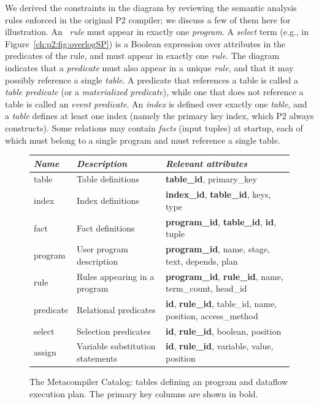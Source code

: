 We derived the constraints in the diagram by reviewing the semantic analysis
rules enforced in the original P2 compiler; we discuss a few of them here for
illustration.  An \OVERLOG~{\em rule} must appear in exactly one {\em program}.
A {\em select} term (e.g.,  in
Figure~\ref{ch:p2:fig:overlogSP}) is a Boolean expression over attributes in
the predicates of the rule, and must appear in exactly one {\em rule}.  The
diagram indicates that a {\em predicate} must also appear in a unique {\em
rule}, and that it may possibly reference a single {\em table}.  A predicate
that references a table is called a {\em table predicate} (or a
\emph{materialized predicate}), while one that does not reference a table is
called an {\em event predicate}.  An {\em index} is defined over exactly one
{\em table}, and a {\em table} defines at least one index (namely the primary
key index, which P2 always constructs).  Some relations may contain {\em facts}
(input tuples) at startup, each of which must belong to a single program and
must reference a single table.

\begin{figure}
\centering
\ssp
\begin{tabular}{|l|l|p{6.3cm}|} \hline
{\it Name}& {\it Description} & {\it Relevant attributes} \\ \hline\hline
table     & Table definitions & {\bf table\_id}, primary\_key\\ \hline
index     & Index definitions & {\bf index\_id}, {\bf table\_id}, keys, type \\ \hline
fact      & Fact definitions  & {\bf program\_id}, {\bf table\_id}, {\bf id}, tuple\\ \hline
program   & User program description     & {\bf program\_id}, name, stage, text, depends, plan \\ \hline
rule      & Rules appearing in a program   & {\bf program\_id}, {\bf rule\_id}, name,  term\_count, head\_id \\ \hline
predicate & Relational predicates  & {\bf id}, {\bf rule\_id}, table\_id, name, position, access\_method \\ \hline
select    & Selection predicates  & {\bf id}, {\bf rule\_id}, boolean, position \\  \hline
assign    & Variable substitution statements & {\bf id}, {\bf rule\_id}, variable, value, position \\ \hline 
\end{tabular}
\caption{The Metacompiler Catalog: tables defining an \OVERLOG program and dataflow execution plan.
         The primary key columns are shown in bold. }
\label{tbl:catalog}
\end{figure}

